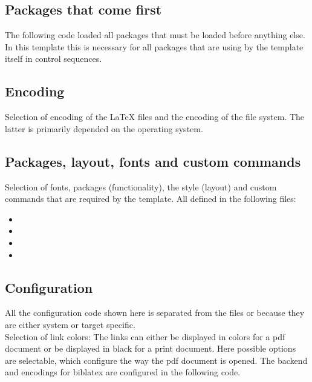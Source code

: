 \subsection{Packages that come first}
The following code loaded all packages that must be loaded before anything else. In this template this is necessary for all packages that are using by the template itself in control sequences.

\subsection{Encoding}
Selection of encoding of the LaTeX files and the encoding of the file system. The latter is primarily depended on the operating system.

\subsection{Packages, layout, fonts and custom commands}
Selection of fonts, packages (functionality), the style (layout) and custom 
commands that are required by the template. All defined in the following files:
%
\begin{itemize}[noitemsep]
\item {}
\item {}
\item {}
\item {}
\end{itemize}


\subsection{Configuration}
All the configuration code shown here is separated from the files  or  because they are either system or target specific.
\medskip\\\noindent
%
Selection of link colors: The links can either be displayed in colors for a pdf document or be displayed in black for a print document.
%
Here possible options are selectable, which configure the way the pdf document is opened.
%
The backend and encodings for biblatex are configured in the following code.

